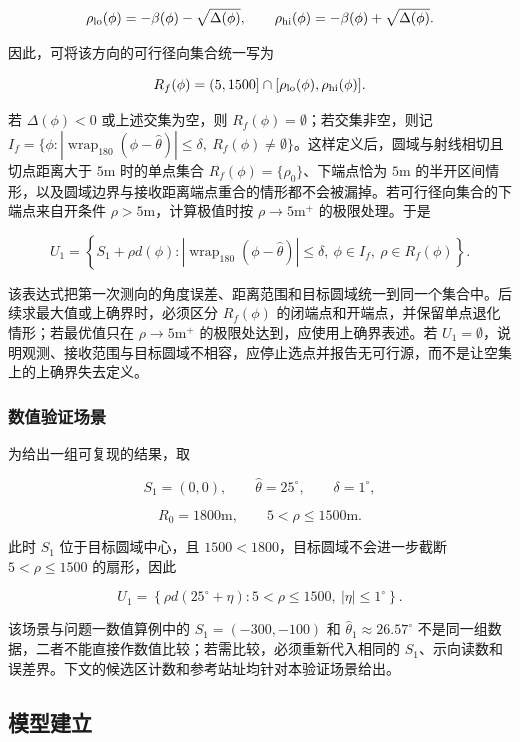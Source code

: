 \[
\rho_{\rm lo}(\phi)=-\beta(\phi)-\sqrt{\Delta(\phi)},
\qquad
\rho_{\rm hi}(\phi)=-\beta(\phi)+\sqrt{\Delta(\phi)}.
\]

因此，可将该方向的可行径向集合统一写为

\[
R_f(\phi)=(5,1500]\cap[\rho_{\rm lo}(\phi),\rho_{\rm hi}(\phi)].
\]

若 $\Delta(\phi)<0$ 或上述交集为空，则 $R_f(\phi)=\emptyset$；若交集非空，则记 $I_f=\{\phi:\left|\operatorname{wrap}_{180}(\phi-\hat\theta)\right|\le\delta,\ R_f(\phi)\ne\emptyset\}$。这样定义后，圆域与射线相切且切点距离大于 $5\mathrm{m}$ 时的单点集合 $R_f(\phi)=\{\rho_0\}$、下端点恰为 $5\mathrm{m}$ 的半开区间情形，以及圆域边界与接收距离端点重合的情形都不会被漏掉。若可行径向集合的下端点来自开条件 $\rho>5\mathrm{m}$，计算极值时按 $\rho\to5\mathrm{m}^+$ 的极限处理。于是

\[
U_1=
\left\{
S_1+\rho d(\phi):
\left|\operatorname{wrap}_{180}(\phi-\hat\theta)\right|\le\delta,
\ \phi\in I_f,\ \rho\in R_f(\phi)
\right\}.
\]

该表达式把第一次测向的角度误差、距离范围和目标圆域统一到同一个集合中。后续求最大值或上确界时，必须区分 $R_f(\phi)$ 的闭端点和开端点，并保留单点退化情形；若最优值只在 $\rho\to5\mathrm{m}^+$ 的极限处达到，应使用上确界表述。若 $U_1=\emptyset$，说明观测、接收范围与目标圆域不相容，应停止选点并报告无可行源，而不是让空集上的上确界失去定义。

\subsubsection{数值验证场景}

为给出一组可复现的结果，取

\[
S_1=(0,0),\qquad \hat\theta=25^\circ,\qquad \delta=1^\circ,
\]

\[
R_0=1800\mathrm{m},\qquad 5<\rho\le1500\mathrm{m}.
\]

此时 $S_1$ 位于目标圆域中心，且 $1500<1800$，目标圆域不会进一步截断 $5<\rho\le1500$ 的扇形，因此

\[
U_1=
\left\{
\rho d(25^\circ+\eta):
5<\rho\le1500,\ |\eta|\le1^\circ
\right\}.
\]

该场景与问题一数值算例中的 $S_1=(-300,-100)$ 和 $\hat\theta_1\approx26.57^\circ$ 不是同一组数据，二者不能直接作数值比较；若需比较，必须重新代入相同的 $S_1$、示向读数和误差界。下文的候选区计数和参考站址均针对本验证场景给出。

\subsection{模型建立}


